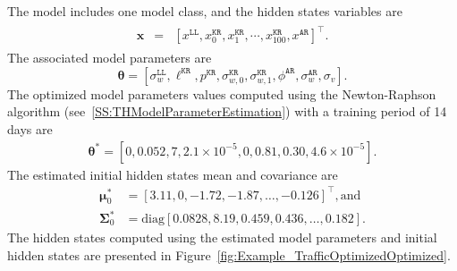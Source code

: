 The model includes one model class, and the hidden states variables are 
\begin{gather*}
\begin{array}{rcl}
\mathbf{x} &=& \left[x^{\mathtt{LL}}, x_{0}^{\mathtt{KR}}, x_{1}^{\mathtt{KR}},\cdots,x_{100}^{\mathtt{KR}}, x^{\mathtt{AR}}\right]^{\intercal}.
\end{array}
\end{gather*}
The associated model parameters are
\begin{equation}
\label{EQ:PTL}
\bm\theta = \left[\sigma^{\mathtt{LL}}_{w}, \ell^{\mathtt{KR}}, p^{\mathtt{KR}}, \sigma_{w,0}^{\mathtt{KR}}, \sigma_{w,1}^{\mathtt{KR}}, \phi^{\mathtt{AR}}, \sigma^{\mathtt{AR}}_{w}, \sigma_{v}\right].
\end{equation}
The optimized model parameters values computed using the Newton-Raphson algorithm (see~\ref{SS:THModelParameterEstimation}) with a training period of 14 days are
\begin{gather*}
\bm\theta^{\text{*}}=[0 , 0.052, 7, 2.1\times10^{-5}, 0, 0.81, 0.30, 4.6\times10^{-5}].
\end{gather*}
The estimated initial hidden states mean and covariance are 
\begin{align*}
\bm \mu^{*}_{0} & = [	 3.11  ,	0  ,   	-1.72  ,	-1.87 ,	\dots, -0.126]^{\intercal}, \text{and} \\
\bm\Sigma^{*}_{0} & = \text{diag}[   0.0828,	8.19,  	0.459, 	0.436 , \dots, 0.182 ].
 \end{align*}
The hidden states computed using the estimated model parameters and initial hidden states are presented in Figure~\ref{fig:Example_TrafficOptimizedOptimized}.










